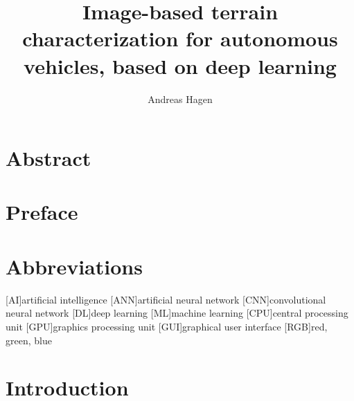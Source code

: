 \documentclass[USenglish]{ifimaster}  %
\title{Image-based terrain characterization for autonomous vehicles, based on deep learning}        %
\author{Andreas Hagen}                      %
\begin{document}
\duoforside[dept={Department of Technology Systems},   %
  program={Cybernetics},  %
  short]                                        %

\frontmatter{}
\chapter*{Abstract}                   %

\tableofcontents{}
\listoffigures{}
\listoftables{}

\chapter*{Preface}
\chapter*{Abbreviations}
\begin{acronym}
        [AI]{artificial intelligence}
        [ANN]{artificial neural network}
        [CNN]{convolutional neural network}
        [DL]{deep learning}
        [ML]{machine learning}
        [CPU]{central processing unit}
        [GPU]{graphics processing unit}
        [GUI]{graphical user interface}
        [RGB]{red, green, blue}
\end{acronym}


\mainmatter{}
\chapter{Introduction}                  
\end{document}
